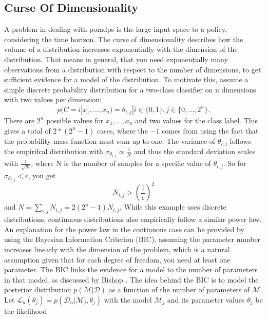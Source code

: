 \subsection{Curse Of Dimensionality}
\label{COD}
A problem in dealing with \ac{pomdp}s is the large input space to a policy, considering the time horizon. 
The curse of dimensionality describes how the volume of a distribution increases exponentially with the dimension of the distribution. That means in general, 
that you need exponentially many observations from a distribution with respect to the number of dimensions, to get sufficient evidence for a model of the distribution. 
To motivate this, assume a simple 
discrete probability distribution for a two-class classifier on n dimensions with two values per dimension:
\begin{equation}
    p(C=i|x_1, ..., x_n)  = \theta_{i,j} | i \in \{0, 1\}, j \in \{0, ..., 2^n\}.
\end{equation}
There are $2^n$ possible values for $x_1, ..., x_n$ and two values for the class label. This gives a total of $2*(2^n-1)$ cases, where the $-1$ comes from using 
the fact that the probability mass function must sum up to one. The variance of $\theta_{i, j}$ follows the empirifcal distribution 
with $\sigma_{\theta_{i,j}} \propto \frac{1}{N}$ and thus the standard deviation scales with $\frac{1}{\sqrt{N}}$, where N is the number of samples 
for a specific value of $\theta_{i,j}$. So for $\sigma_{\theta_{i,j}} < \epsilon$, you get
\begin{equation}
    N_{i,j} > \left(\frac{1}{\epsilon}\right)^2
\end{equation}
and $N = \sum_{i, j} N_{i, j} = 2 (2^n-1) N_{i,j}$. While this example uses discrete distributions, continuous distributions also empirically follow a similar 
power law.\\
An explanation for the power law in the continuous case can be provided by using the Bayesian Information Criterion (BIC), assuming the parameter number increases linearly with the dimension 
of the problem, which is a natural assumption given that for each degree of freedom, you need at least one parameter. 
The BIC links the evidence for a model to the number of parameters in that model, as discussed by Bishop \cite[chapter 4.4.1]{bishop}.
The idea behind the BIC is to model the posterior distribution $p(\mathcal{M}|\mathcal{D})$ as a function of the number of parameters of $\mathcal{M}$. 
Let $\mathcal{L}_n(\theta_j) = p(\mathcal{D}_n|\mathcal{M}_j, \theta_{j})$ with the model $\mathcal{M}_j$ and its parameter values $\theta_j$ be the likelihood 
